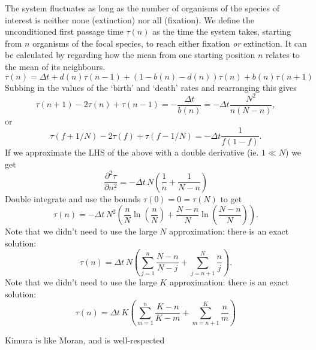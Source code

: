 \documentclass[a4paper,11pt]{article}
\numberwithin{equation}{section} %
\begin{document}
The system fluctuates as long as the number of organisms of the species of interest is neither none (extinction) nor all (fixation). 
We define the unconditioned first passage time $\tau(n)$ as the time the system takes, starting from $n$ organisms of the focal species, to reach either fixation \emph{or} extinction. 
It can be calculated by regarding how the mean from one starting position $n$ relates to the mean of its neighbours. 
\begin{equation}
\tau(n) = \Delta t + d(n)\tau(n-1) + \left(1-b(n)-d(n)\right)\tau(n) + b(n)\tau(n+1)
\end{equation}
Subbing in the values of the `birth' and `death' rates and rearranging this gives
\begin{equation}
\tau(n+1) - 2\tau(n) + \tau(n-1) = -\frac{\Delta t}{b(n)} = -\Delta t\frac{N^2}{n(N-n)},
\end{equation}
or
\begin{equation}
\tau(f+1/N) - 2\tau(f) + \tau(f-1/N) = -\Delta t\frac{1}{f(1-f)}. 
\end{equation}
If we approximate the LHS of the above with a double derivative (ie. $1\ll N$) we get
\begin{equation}
\frac{\partial^2\tau}{\partial n^2} = -\Delta t\,N\left(\frac{1}{n}+\frac{1}{N-n}\right)
\end{equation}
Double integrate and use the bounds $\tau(0) = 0 = \tau(N)$ to get
\begin{equation}
\tau(n) = -\Delta t\,N^2\left(\frac{n}{N}\ln\left(\frac{n}{N}\right)+\frac{N-n}{N}\ln\left(\frac{N-n}{N}\right)\right). 
\end{equation}
Note that we didn't need to use the large $N$ approximation: there is an exact solution:
\begin{equation}
\tau(n) = \Delta t\,N\left(\sum_{j=1}^n\frac{N-n}{N-j} + \sum_{j=n+1}^N\frac{n}{j}\right). 
\end{equation}
Note that we didn't need to use the large $K$ approximation: there is an exact solution:
\begin{equation}
\tau(n) = \Delta t\,K\left(\sum_{m=1}^n\frac{K-n}{K-m} + \sum_{m=n+1}^K\frac{n}{m}\right)
\end{equation}
\begin{figure}
	\centering
\end{figure}

Kimura is like Moran, and is well-respected
\end{document}
